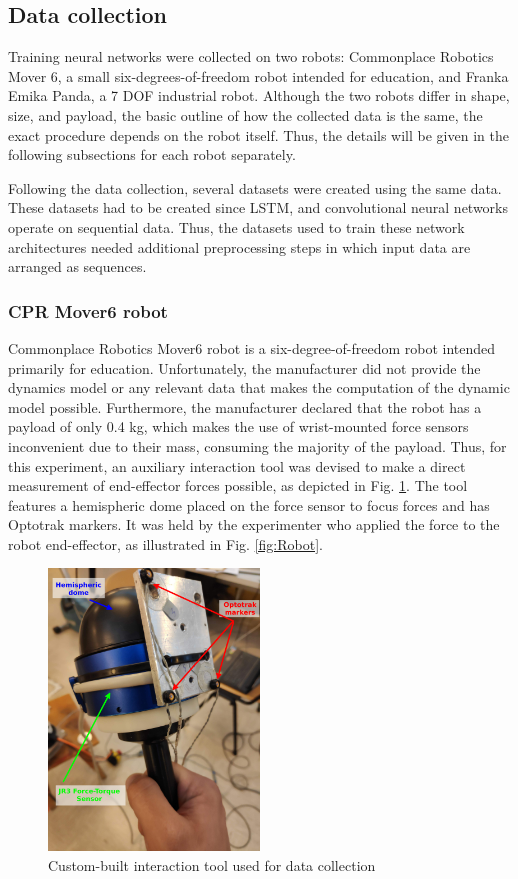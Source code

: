 \subsection{Data collection}

Training neural networks were collected on two robots: Commonplace Robotics Mover 6, a small six-degrees-of-freedom robot intended for education, and Franka Emika Panda, a 7 DOF industrial robot. Although the two robots differ in shape, size, and payload, the basic outline of how the collected data is the same, the exact procedure depends on the robot itself. Thus, the details will be given in the following subsections for each robot separately.

Following the data collection, several datasets were created using the same data. These datasets had to be created since LSTM, and convolutional neural networks operate on sequential data. Thus, the datasets used to train these network architectures needed additional preprocessing steps in which input data are arranged as sequences.

\subsubsection{CPR Mover6 robot}

Commonplace Robotics Mover6 robot is a six-degree-of-freedom robot intended primarily for education. Unfortunately, the manufacturer did not provide the dynamics model or any relevant data that makes the computation of the dynamic model possible. Furthermore, the manufacturer declared that the robot has a payload of only 0.4 kg, which makes the use of wrist-mounted force sensors inconvenient due to their mass, consuming the majority of the payload. Thus, for this experiment, an auxiliary interaction tool was devised to make a direct measurement of end-effector forces possible, as depicted in Fig. \ref{fig:Tool}. The tool features a hemispheric dome placed on the force sensor to focus forces and has Optotrak markers. It was held by the experimenter who applied the force to the robot end-effector, as illustrated in Fig. \ref{fig:Robot}. 

\begin{figure}
    \centering
    \includegraphics[width=0.5\textwidth]{slike/tool}
    \caption{Custom-built interaction tool used for data collection}
    \label{fig:Tool}
\end{figure}

